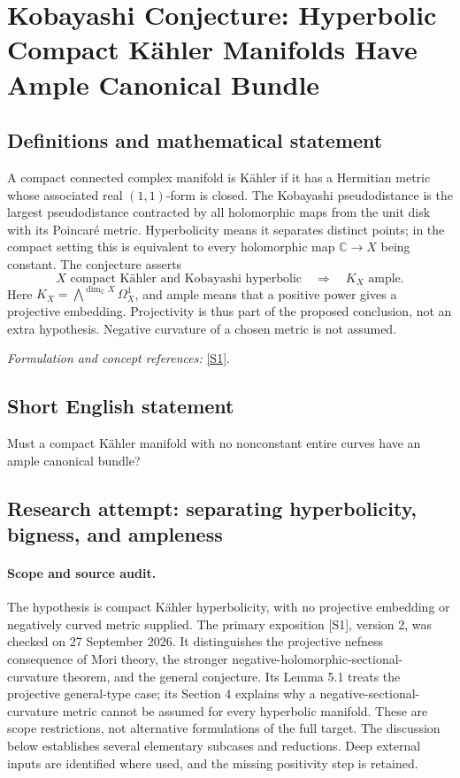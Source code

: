 \documentclass[11pt]{article}
\begin{document}
\section*{\texorpdfstring{Kobayashi Conjecture: Hyperbolic Compact Kähler Manifolds Have Ample Canonical Bundle}{Kobayashi Conjecture: Hyperbolic Compact Kähler Manifolds Have Ample Canonical Bundle}}\label{364}
\subsection{Definitions and mathematical statement}
A compact connected complex manifold is K\"ahler if it has a Hermitian metric whose associated real $(1,1)$-form is closed. The Kobayashi pseudodistance is the largest pseudodistance contracted by all holomorphic maps from the unit disk with its Poincar\'e metric. Hyperbolicity means it separates distinct points; in the compact setting this is equivalent to every holomorphic map ${\mathbb{C}}\to X$ being constant. The conjecture asserts
\[
 X\text{ compact K\"ahler and Kobayashi hyperbolic}
 \quad\Longrightarrow\quad K_X\text{ ample}.
\]
Here $K_X=\bigwedge^{\dim_{{\mathbb{C}}} X}\Omega_X^1$, and ample means that a positive power gives a projective embedding. Projectivity is thus part of the proposed conclusion, not an extra hypothesis. Negative curvature of a chosen metric is not assumed.
\par\smallskip\textit{Formulation and concept references:} \href{https://arxiv.org/pdf/2011.11379}{[S1]}.

\subsection{Short English statement}
Must a compact K\"ahler manifold with no nonconstant entire curves have an ample canonical bundle?
\subsection{Research attempt: separating hyperbolicity, bigness, and ampleness}
\paragraph{Scope and source audit.}
The hypothesis is compact K\"ahler hyperbolicity, with no projective embedding or negatively curved metric supplied. The primary exposition [S1], version 2, was checked on 27 September 2026. It distinguishes the projective nefness consequence of Mori theory, the stronger negative-holomorphic-sectional-curvature theorem, and the general conjecture. Its Lemma 5.1 treats the projective general-type case; its Section 4 explains why a negative-sectional-curvature metric cannot be assumed for every hyperbolic manifold. These are scope restrictions, not alternative formulations of the full target. The discussion below establishes several elementary subcases and reductions. Deep external inputs are identified where used, and the missing positivity step is retained.
\end{document}
